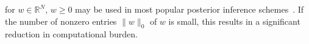 \documentclass[a4paper,12pt,index,custombib]{Classes/PhDThesisPSnPDF}
\begin{document}
\noindent
for $w\in\mathbb{R}^N$, $w\geq 0$ may be used in most popular posterior inference schemes~\citep{neal11,kucukelbir17,ranganath14}. If the number of nonzero entries $\|w\|_0$ of $w$ is small, this results in a significant reduction in computational burden.
\end{document}
